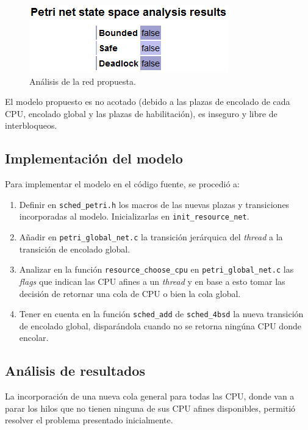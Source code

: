 \documentclass[a4paper]{book}
\begin{document}
\begin{figure} [H]
	\begin{center}
        \includegraphics[scale=0.7]{./imagenes/it8validacion.png}
		\caption{An\'alisis de la red propuesta.}
		\label{Fig:validacion8}
	\end{center}
\end{figure}

El modelo propuesto es no acotado (debido a las plazas de encolado de cada CPU, encolado global y las plazas de habilitaci\'on), es inseguro y libre de interbloqueos.

\subsection{Implementaci\'on del modelo}
Para implementar el modelo en el c\'odigo fuente, se procedi\'o a:
\begin{enumerate}
\item Definir en \verb|sched_petri.h| los macros de las nuevas plazas y transiciones incorporadas al modelo. Inicializarlas en \verb|init_resource_net|.
\item A\~nadir en \verb|petri_global_net.c| la transici\'on jer\'arquica del \emph{thread} a la transici\'on de encolado global.
\item Analizar en la funci\'on \verb|resource_choose_cpu| en \verb|petri_global_net.c| las \emph{flags} que indican las CPU afines a un \emph{thread} y en base a esto tomar las decisi\'on de retornar una cola de CPU o bien la cola global.
\item Tener en cuenta en la funci\'on \verb|sched_add| de \verb|sched_4bsd| la nueva transici\'on de encolado global, dispar\'andola cuando no se retorna ning\'una CPU donde encolar.
\end{enumerate}

\subsection{An\'alisis de resultados}
La incorporaci\'on de una nueva cola general para todas las CPU, donde van a parar los hilos que no tienen ninguna de sus CPU afines disponibles, permiti\'o resolver el problema presentado inicialmente. \\
\end{document}
